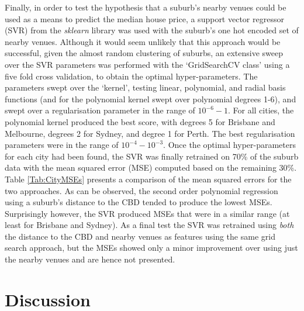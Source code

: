 \documentclass[12pt]{article}
\begin{document}
    Finally, in order to test the hypothesis that a suburb's nearby venues could be used as a means to predict the median house price, a support vector regressor (SVR) from the \emph{sklearn} library was used with the suburb's one hot encoded set of nearby venues. Although it would seem unlikely that this approach would be successful, given the almost random clustering of suburbs, an extensive sweep over the SVR parameters was performed with the `GridSearchCV class' using a five fold cross validation, to obtain the optimal hyper-parameters. The parameters swept over the `kernel', testing linear, polynomial, and radial basis functions (and for the polynomial kernel swept over polynomial degrees 1-6), and swept over a regularisation parameter in the range of $10^{-6}-1$. For all cities, the polynomial kernel produced the best score, with degrees 5 for Brisbane and Melbourne, degrees 2 for Sydney, and degree 1 for Perth. The best regularisation parameters were in the range of $10^{-4}-10^{-3}$. Once the optimal hyper-parameters for each city had been found, the SVR was finally retrained on 70\% of the suburb data with the mean squared error (MSE) computed based on the remaining 30\%. Table \ref{Tab:CityMSEs} presents a comparison of the mean squared errors for the two approaches. As can be observed, the second order polynomial regression using a suburb's distance to the CBD tended to produce the lowest MSEs. Surprisingly however, the SVR produced MSEs that were in a similar range (at least for Brisbane and Sydney). As a final test the SVR was retrained using \emph{both} the distance to the CBD and nearby venues as features using the same grid search approach, but the MSEs showed only a minor improvement over using just the nearby venues and are hence not presented.

\section{Discussion}
\end{document}
